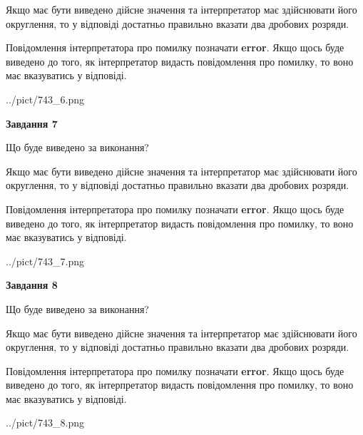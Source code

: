 \documentclass[12pt, ukrainian]{article}
\begin{document}
{\begin {Large}
Якщо має бути виведено дійсне значення та інтерпретатор має здійснювати його округлення, 
то у відповіді достатньо правильно вказати два дробових розряди.

Повідомлення інтерпретатора про помилку позначати \textbf{error}.
Якщо щось буде виведено до того, як інтерпретатор видасть повідомлення про помилку, 
то воно має вказуватись у відповіді. \par

\begin{center}
	{../pict/743_6.png}
\end{center}
\newpage

{\begin {center}\textbf{Завдання 7}\end {center}}\par
Що буде виведено за виконання? \par

Якщо має бути виведено дійсне значення та інтерпретатор має здійснювати його округлення, 
то у відповіді достатньо правильно вказати два дробових розряди.

Повідомлення інтерпретатора про помилку позначати \textbf{error}.
Якщо щось буде виведено до того, як інтерпретатор видасть повідомлення про помилку, 
то воно має вказуватись у відповіді. \par

\begin{center}
	{../pict/743_7.png}
\end{center}
\newpage

{\begin {center}\textbf{Завдання 8}\end {center}}\par
Що буде виведено за виконання? \par

Якщо має бути виведено дійсне значення та інтерпретатор має здійснювати його округлення, 
то у відповіді достатньо правильно вказати два дробових розряди.

Повідомлення інтерпретатора про помилку позначати \textbf{error}.
Якщо щось буде виведено до того, як інтерпретатор видасть повідомлення про помилку, 
то воно має вказуватись у відповіді. \par

\begin{center}
	{../pict/743_8.png}
\end{center}
\newpage


\end{Large}}
\end{document}
